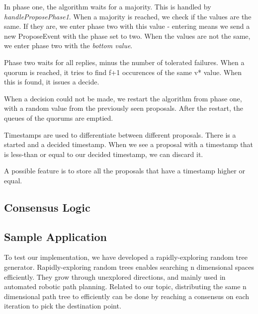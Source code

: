 \documentclass[times, 12pt,twocolumn]{article}
\begin{document}
In phase one, the algorithm waits for a majority. This is handled by 
\textit{handleProposePhase1}. When a majority is reached, we check if the values 
are the same. If they are, we enter phase two with this value - entering means 
we send a new ProposeEvent with the phase set to two. When the values are not the 
same, we enter phase two with the \textit{bottom value}.

Phase two waits for all replies, minus the number of tolerated failures. 
When a quorum is reached, it tries to find f+1 occurences of the same v* value. 
When this is found, it issues a decide.

When a decision could not be made, we restart the algorithm from phase one, with 
a random value from the previously seen proposals. After the restart, the 
queues of the quorums are emptied.

Timestamps are used to differentiate between different proposals. There is a started 
and a decided timestamp. When we see a proposal with a timestamp that is less-than 
or equal to our decided timestamp, we can discard it. 

A possible feature is to store all the proposals that have a timestamp higher or equal.



\subsection{Consensus Logic}

\subsection{Sample Application}

To test our implementation, we have developed a rapidly-exploring random tree generator. Rapidly-exploring random trees\cite{Lavalle98rapidly-exploringrandom} enables searching n dimensional spaces efficiently. They grow through unexplored directions, and mainly used in automated robotic path planning. Related to our topic, distributing the same n dimensional path tree to efficiently can be done by reaching a consensus on each iteration to pick the destination point.
\end{document}
